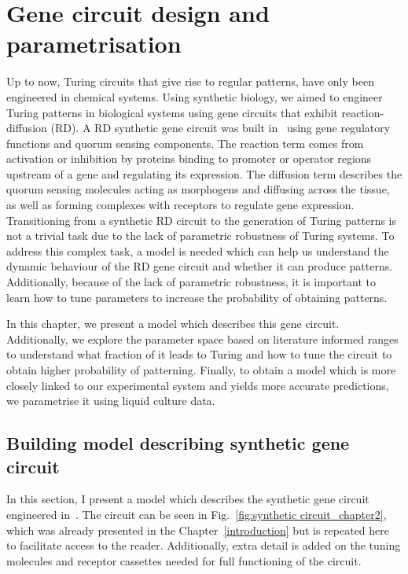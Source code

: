 
\chapter{Gene circuit design and parametrisation} \label{chapter2}
Up to now, Turing circuits that give rise to regular patterns, have only been engineered in chemical systems.
Using synthetic biology, we aimed to engineer Turing patterns in biological systems using gene circuits that exhibit reaction-diffusion (RD).
A RD synthetic gene circuit was built in~\cite{Tica2020}
using gene regulatory functions and quorum sensing components.
The reaction term comes from activation or inhibition by proteins binding to promoter or operator regions upstream of a gene
and regulating its expression.
The diffusion term describes the quorum sensing molecules acting as morphogens and diffusing across the tissue,
as well as forming complexes with receptors to regulate gene expression.
Transitioning from a synthetic RD circuit to the generation of Turing patterns is not a trivial task due to the lack of parametric robustness of Turing systems.
To address this complex task, a model is needed which can help us understand the dynamic behaviour of the RD gene circuit and whether it can produce patterns.
Additionally, because of the lack of parametric robustness, it is important to learn how to tune parameters to increase the probability of obtaining patterns.

In this chapter, we present a model which describes this gene circuit.
Additionally, we explore the parameter space based on literature informed ranges to understand what fraction of it leads to Turing and how to tune the circuit to obtain higher probability of patterning.
Finally, to obtain a model which is more closely linked to our experimental system and yields more accurate predictions,
we parametrise it using liquid culture data.

\section{Building model describing synthetic gene circuit}
In this section, I present a model which describes the synthetic gene circuit engineered in~\cite{Tica2020}.
The circuit can be seen in Fig.~\ref{fig:synthetic circuit_chapter2}, which was already presented in the Chapter~\ref{introduction} but is repeated here to facilitate access to the reader.
Additionally, extra detail is added on the tuning molecules and receptor cassettes needed for full functioning of the circuit.

